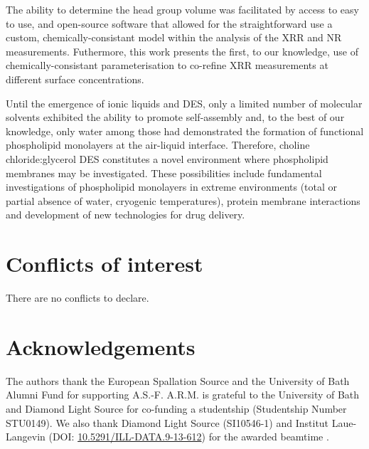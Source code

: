 \documentclass[twoside,twocolumn,9pt]{article}
\renewcommand{\refname}{Notes and references}
\begin{document}
The ability to determine the head group volume was facilitated by access to easy to use, and open-source software that allowed for the straightforward use a custom, chemically-consistant model within the analysis of the XRR and NR measurements. Futhermore, this work presents the first, to our knowledge, use of chemically-consistant parameterisation to co-refine XRR measurements at different surface concentrations. 

Until the emergence of ionic liquids and DES, only a limited number of molecular solvents exhibited the ability to promote self-assembly and, to the best of our knowledge, only water among those had demonstrated the formation of functional phospholipid monolayers at the air-liquid interface. Therefore, choline chloride:glycerol DES constitutes a novel environment where phospholipid membranes may be investigated. These possibilities include fundamental investigations of phospholipid monolayers in extreme environments (total or partial absence of water, cryogenic temperatures), protein membrane interactions and development of new technologies for drug delivery.

\section*{Conflicts of interest}
There are no conflicts to declare.

\section*{Acknowledgements}
The authors thank the European Spallation Source and the University of Bath Alumni Fund for supporting A.S.-F. A.R.M. is grateful to the University of Bath and Diamond Light Source for co-funding a studentship (Studentship Number STU0149). We also thank Diamond Light Source (SI10546-1) and Institut Laue-Langevin (DOI: \href{http://doi.org/10.5291/ILL-DATA.9-13-612}{10.5291/ILL-DATA.9-13-612}) for the awarded beamtime .



\balance


\end{document}
